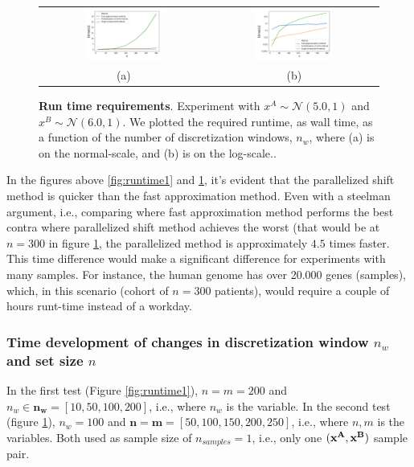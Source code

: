 \documentclass[a4paper]{article}
\begin{document}
\begin{figure}[H]
  \centering
  \begin{tabular}{cc}
  \includegraphics[width=0.48\textwidth]{figures/SNSruntimeSingleThread6_0.png}\label{fig:noarmal04} &  \includegraphics[width=0.48\textwidth]{figures/SNSruntimeLogSingleThread6_0.png}\label{fig:normal11} \\
  (a) & (b)
  \end{tabular}
  \caption{{\bf Run time requirements}. Experiment with $x^{A} \sim \mathcal{N}(5.0,1)$ and $x^{B} \sim \mathcal{N}(6.0,1)$. We plotted the required runtime, as wall time, as a function of the number of discretization windows, $n_w$, where (a) is on the normal-scale, and (b) is on the log-scale..\label{fig:runtime2}}
\end{figure}

In the figures above \ref{fig:runtime1} and \ref{fig:runtime2}, it's evident that the parallelized shift method is quicker than the fast approximation method. Even with a steelman argument, i.e., comparing where fast approximation method performs the best contra where parallelized shift method achieves the worst (that would be at $n=300$ in figure \ref{fig:runtime2}, the parallelized method is approximately $4.5$ times faster. This time difference would make a significant difference for experiments with many samples. For instance, the human genome has over 20.000 genes (samples), which, in this scenario (cohort of $n=300$ patients), would require a couple of hours runt-time instead of a workday.

\subsubsection{Time development of changes in discretization window $n_ w$ and set size $n$}
In the first test (Figure \ref{fig:runtime1}), $n=m=200$ and $n_{w} \in \mathbf{n_{w}}=[10,50,100,200]$, i.e., where $n_{w}$ is the variable. In the second test (figure \ref{fig:runtime2}), $n_{w}=100$ and $\mathbf{n}=\mathbf{m}=[50, 100,150,200,250]$, i.e., where $n,m$ is the variables. Both used as sample size of $n_{samples}=1$, i.e., only one $(\bf{x^{A}}, \bf{x^{B}})$ sample pair.
\end{document}
